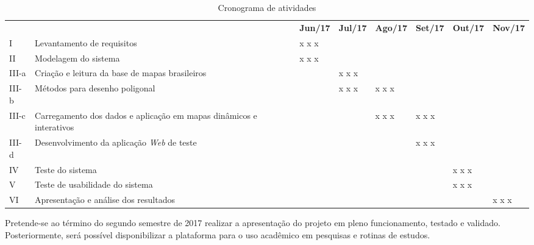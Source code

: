 \documentclass[12pt]{article}
\begin{document}
\begin{table}[!htbp]
	\centering
    \caption{Cronograma de atividades}
	\begin{tabular}{|>{\centering\arraybackslash}m{0.7cm}|>{\arraybackslash}m{5cm}|>{\centering\arraybackslash}m{0.9cm}|>{\centering\arraybackslash}m{0.9cm}|>{\centering\arraybackslash}m{0.9cm}|>{\centering\arraybackslash}m{0.9cm}|>{\centering\arraybackslash}m{0.9cm}|>{\centering\arraybackslash}m{0.9cm}|}
     \hline
     \multicolumn{1}{|c|}{\multirow{2}{*}{\textbf{Item}}} & \multicolumn{1}{c|}{\multirow{2}{*}{\textbf{Atividades}}} & \multicolumn{6}{c|}{\textbf{Período}} \\
     \cline{3-8} & & \textbf{Jun/17} & \textbf{Jul/17} & \textbf{Ago/17} & \textbf{Set/17} & \textbf{Out/17} & \textbf{Nov/17} \\ \hline
      I & Levantamento de requisitos & \cellcolor[rgb]{.75, .75, .75}x x x &  &  &  &  & \\ \hline
      II & Modelagem do sistema & \cellcolor[rgb]{.75, .75, .75}x x x &  &  &  &  & \\ \hline
      III-a & Criação e leitura da base de mapas brasileiros &  & \cellcolor[rgb]{.75, .75, .75}x x x &  &  &  & \\ \hline
      III-b & Métodos para desenho poligonal &  & \cellcolor[rgb]{.75, .75, .75}x x x & \cellcolor[rgb]{.75, .75, .75}x x x &  &  & \\ \hline
      III-c & Carregamento dos dados e aplicação em mapas dinâmicos e interativos &  &  & \cellcolor[rgb]{.75, .75, .75}x x x & \cellcolor[rgb]{.75, .75, .75}x x x &  & \\ \hline
      III-d & Desenvolvimento da aplicação \emph{Web} de teste &  &  &  & \cellcolor[rgb]{.75, .75, .75}x x x &  & \\ \hline
      IV & Teste do sistema &  &  &  &  & \cellcolor[rgb]{.75, .75, .75}x x x & \\ \hline
      V & Teste de usabilidade do sistema &  &  &  &  & \cellcolor[rgb]{.75, .75, .75}x x x & \\ \hline
      VI & Apresentação e análise dos resultados &  &  &  &  &  & \cellcolor[rgb]{.75, .75, .75}x x x \\ \hline
	\end{tabular}
    \label{tabcronograma}
\end{table}


Pretende-se ao término do segundo semestre de 2017 realizar a apresentação do projeto em pleno funcionamento, testado e validado. Posteriormente, será possível disponibilizar a plataforma para o uso acadêmico em pesquisas e rotinas de estudos.

\pagebreak



\end{document}
